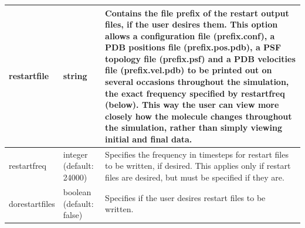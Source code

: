 \documentclass[11pt]{report}
\begin{document}
\begin{tabular}{|p{5.5cm}|p{4cm}|p{6cm}|}
    restartfile &
    string &
    Contains the file prefix of the restart output files, if the user desires them.  This option allows a configuration file (prefix.conf), a PDB positions file (prefix.pos.pdb), a PSF topology file (prefix.psf) and a PDB velocities file (prefix.vel.pdb) to be printed out on several occasions throughout the simulation, the exact frequency specified by restartfreq (below).  This way the user can view more closely how the molecule changes throughout the simulation, rather than simply viewing initial and final data.  \\\hline

  
    restartfreq &
    integer (default: 24000) &
    Specifies the frequency in timesteps for restart files to be written, if desired.  This applies only if restart files are desired, but must be specified if they are. \\\hline

  
    dorestartfiles &
    boolean (default: false) &
    Specifies if the user desires restart files to be written. \\\hline




  \end{tabular}
  \newpage
\end{document}
